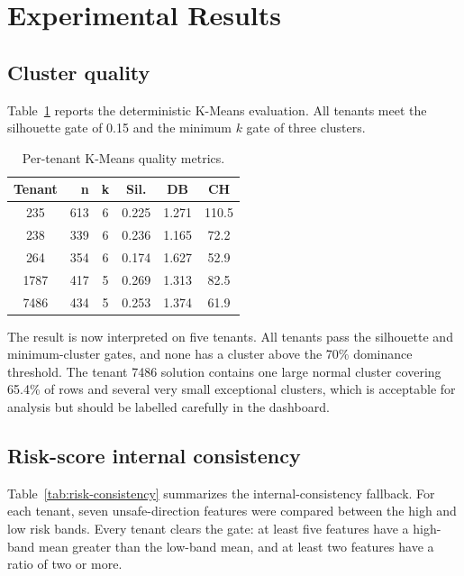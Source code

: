 \section{Experimental Results}

\subsection{Cluster quality}
Table~\ref{tab:kmeans-eval} reports the deterministic K-Means evaluation. All tenants meet the silhouette gate of 0.15 and the minimum $k$ gate of three clusters.

\begin{table}[h]
\centering
\caption{Per-tenant K-Means quality metrics.}
\label{tab:kmeans-eval}
\small
\begin{tabular}{|c|r|c|c|c|c|}
\hline
\textbf{Tenant} & \textbf{n} & \textbf{k} & \textbf{Sil.} & \textbf{DB} & \textbf{CH} \\
\hline
235  & 613 & 6 & 0.225 & 1.271 & 110.5 \\
238  & 339 & 6 & 0.236 & 1.165 & 72.2 \\
264  & 354 & 6 & 0.174 & 1.627 & 52.9 \\
1787 & 417 & 5 & 0.269 & 1.313 & 82.5 \\
7486 & 434 & 5 & 0.253 & 1.374 & 61.9 \\
\hline
\end{tabular}
\end{table}

The result is now interpreted on five tenants. All tenants pass the silhouette and minimum-cluster gates, and none has a cluster above the 70\% dominance threshold. The tenant 7486 solution contains one large normal cluster covering 65.4\% of rows and several very small exceptional clusters, which is acceptable for analysis but should be labelled carefully in the dashboard.

\subsection{Risk-score internal consistency}
Table~\ref{tab:risk-consistency} summarizes the internal-consistency fallback. For each tenant, seven unsafe-direction features were compared between the high and low risk bands. Every tenant clears the gate: at least five features have a high-band mean greater than the low-band mean, and at least two features have a ratio of two or more.

